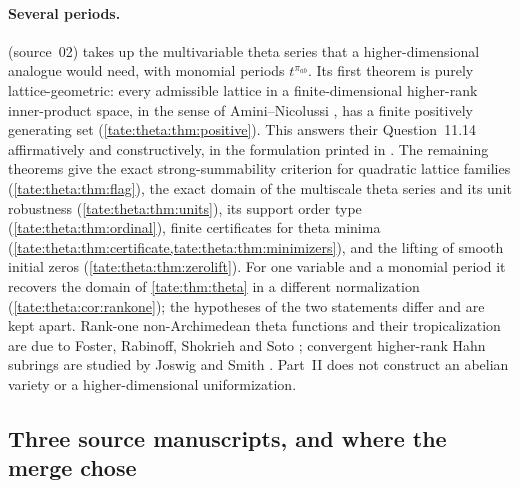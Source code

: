 \documentclass[11pt,letterpaper]{article}
\theoremstyle{definition}
\begin{document}
\paragraph{Several periods.}
 (source~02) takes up the multivariable theta series
that a higher-dimensional analogue would need, with monomial periods
$t^{\pi_{ab}}$. Its first theorem is purely lattice-geometric: every
admissible lattice in a finite-dimensional higher-rank inner-product space,
in the sense of Amini--Nicolussi \cite{AN}, has a finite positively
generating set (\cref{tate:theta:thm:positive}). This answers their
Question~11.14 affirmatively and constructively, in the formulation
printed in \cite[\S11.5.3, p.~1181]{AN}. The remaining theorems give the
exact strong-summability criterion for quadratic lattice families
(\cref{tate:theta:thm:flag}), the exact domain of the multiscale theta
series and its unit robustness (\cref{tate:theta:thm:units}), its support
order type (\cref{tate:theta:thm:ordinal}), finite certificates for theta
minima (\cref{tate:theta:thm:certificate,tate:theta:thm:minimizers}), and
the lifting of smooth initial zeros (\cref{tate:theta:thm:zerolift}).
For one variable and a monomial period it recovers the domain of
\cref{tate:thm:theta} in a different normalization
(\cref{tate:theta:cor:rankone}); the hypotheses of the two statements differ
and are kept apart. Rank-one non-Archimedean theta functions and their
tropicalization are due to Foster, Rabinoff, Shokrieh and Soto \cite{FRSS};
convergent higher-rank Hahn subrings are studied by Joswig and Smith
\cite{JS}. Part~II does not construct an abelian variety or a
higher-dimensional uniformization.

\subsection{Three source manuscripts, and where the merge chose}
\label{tate:sec:sources}
\end{document}
